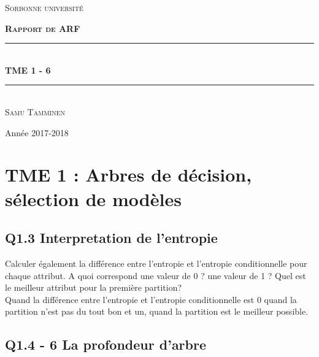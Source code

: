 \documentclass[a4paper,12pt]{article}
\begin{document}
	\newcommand{\HRule}{\rule{\linewidth}{0.5mm}}

	\begin{titlepage}

		\center

		\textsc{\LARGE Sorbonne université}\\[1.5cm] %

        \begin{minipage}{0.4\textwidth}
		\begin{flushleft} \large
		\end{flushleft}
		\end{minipage}




		\textsc{\huge \bfseries Rapport de ARF}\\[.5cm]

		\HRule \\[0.4cm]
		{ \huge \bfseries TME 1 - 6 }\\[0.4cm]
		\HRule \\[4cm]

		{ \huge \textsc{Samu Tamminen} }

		\vfill
		Année 2017-2018
	\end{titlepage}



\newpage
\tableofcontents
\newpage

\section{TME 1 : Arbres de décision, sélection de modèles}

\subsection{Q1.3 Interpretation de l'entropie}
Calculer également la différence entre l’entropie et l’entropie conditionnelle pour chaque attribut.
A quoi correspond une valeur de 0 ? une valeur de 1 ? Quel est le meilleur attribut pour la première partition?
\\
Quand la différence entre l'entropie et l'entropie conditionnelle est 0 quand la partition n'est pas du tout bon et un,
quand la partition est le meilleur possible.

\subsection{Q1.4 - 6 La profondeur d'arbre }
\end{document}
